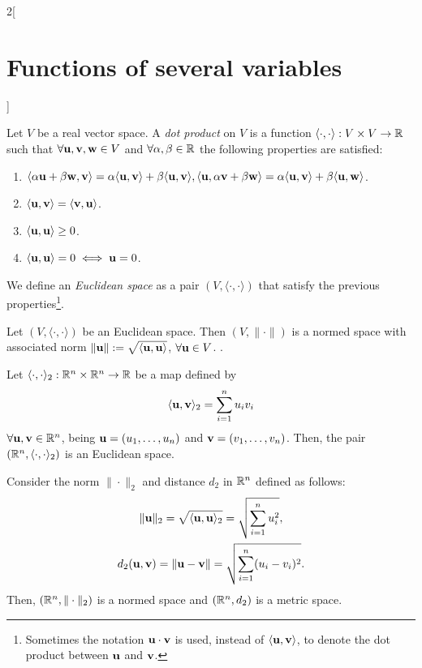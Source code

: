 \documentclass[../../../main.tex]{subfiles}
\begin{document}
\begin{multicols}{2}[\section{Functions of several variables}]
\begin{definition}
    Let $V$ be a real vector space. A \textit{dot product} on $V$ is a function $\langle\cdot,\cdot\rangle:V\times V\rightarrow\mathbb{R} $ such that $\forall \boldsymbol{\mathrm{u}},\boldsymbol{\mathrm{v}},\boldsymbol{\mathrm{w}}\in V$ and $\forall\alpha,\beta\in\mathbb{R} $ the following properties are satisfied:
    \begin{enumerate}
      \item $\langle \alpha \boldsymbol{\mathrm{u}}+\beta \boldsymbol{\mathrm{w}},\boldsymbol{\mathrm{v}}\rangle=\alpha\langle \boldsymbol{\mathrm{u}},\boldsymbol{\mathrm{v}}\rangle+\beta\langle \boldsymbol{\mathrm{u}},\boldsymbol{\mathrm{v}}\rangle,\\\langle \boldsymbol{\mathrm{u}},\alpha \boldsymbol{\mathrm{v}}+\beta \boldsymbol{\mathrm{w}}\rangle=\alpha\langle \boldsymbol{\mathrm{u}},\boldsymbol{\mathrm{v}}\rangle+\beta\langle \boldsymbol{\mathrm{u}},\boldsymbol{\mathrm{w}}\rangle$.
      \item $\langle \boldsymbol{\mathrm{u}},\boldsymbol{\mathrm{v}}\rangle=\langle \boldsymbol{\mathrm{v}},\boldsymbol{\mathrm{u}}\rangle$.
      \item $\langle \boldsymbol{\mathrm{u}},\boldsymbol{\mathrm{u}}\rangle\geq 0$.
      \item $\langle \boldsymbol{\mathrm{u}},\boldsymbol{\mathrm{u}}\rangle=0\iff \boldsymbol{\mathrm{u}}=0$.
    \end{enumerate}
    We define an \textit{Euclidean space} as a pair $(V,\langle\cdot,\cdot\rangle)$ that satisfy the previous properties\footnote{Sometimes the notation $\boldsymbol{\mathrm{u}}\cdot \boldsymbol{\mathrm{v}}$ is used, instead of $\langle \boldsymbol{\mathrm{u}},\boldsymbol{\mathrm{v}}\rangle$, to denote the dot product between $\boldsymbol{\mathrm{u}}$ and $\boldsymbol{\mathrm{v}}$.}.
  \end{definition}
  \begin{prop}
    Let $(V,\langle\cdot,\cdot\rangle)$ be an Euclidean space. Then $(V,\|\cdot\|)$ is a normed space with associated norm $\|\boldsymbol{\mathrm{u}}\|:=\sqrt{\langle \boldsymbol{\mathrm{u}},\boldsymbol{\mathrm{u}}\rangle}$, $\forall \boldsymbol{\mathrm{u}}\in V$. .
  \end{prop}
  \begin{prop}
    Let $\langle\cdot,\cdot\rangle_2:\mathbb{R}^n\times\mathbb{R}^n\rightarrow\mathbb{R} $ be a map defined by $$\langle \boldsymbol{\mathrm{u}},\boldsymbol{\mathrm{v}}\rangle_2=\sum_{i=1}^nu_iv_i$$ $\forall \boldsymbol{\mathrm{u}},\boldsymbol{\mathrm{v}}\in \mathbb{R}^n$, being $\boldsymbol{\mathrm{u}}=(u_1,\ldots,u_n)$ and $\boldsymbol{\mathrm{v}}=(v_1,\ldots,v_n)$. Then, the pair $(\mathbb{R}^n,\langle\cdot,\cdot\rangle_2)$ is an Euclidean space.
  \end{prop}
  \begin{corollary}
    Consider the norm $\|\cdot\|_2$ and distance $d_2$ in $\mathbb{R}^n$ defined as follows:
    \begin{gather*}
      \|\boldsymbol{\mathrm{u}}\|_2=\sqrt{\langle \boldsymbol{\mathrm{u}},\boldsymbol{\mathrm{u}}\rangle_2}=\sqrt{\sum_{i=1}^nu_i^2},\\
      d_2(\boldsymbol{\mathrm{u}},\boldsymbol{\mathrm{v}})=\|\boldsymbol{\mathrm{u}}-\boldsymbol{\mathrm{v}}\|=\sqrt{\sum_{i=1}^n(u_i-v_i)^2}.
    \end{gather*}
    Then, $(\mathbb{R}^n,\|\cdot\|_2)$ is a normed space and $(\mathbb{R}^n,d_2)$ is a metric space.

\end{corollary}
\end{multicols}
\end{document}

